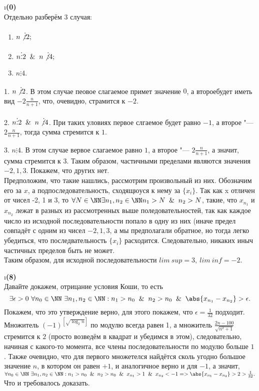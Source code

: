 \i \textbf{(0)}\\
Отдельно разберём 3 случая:
\begin{enumerate}
    \item $n \not\vdots 2;$
    \item $n \vdots 2 \And n \not\vdots 4;$
    \item $n \vdots 4.$
\end{enumerate}
\par 1. $n \not\vdots 2$. В этом случае пеовое слагаемое примет значение $0$, а второебудет иметь вид $-2\frac{n}{n+1}$, что, очевидно, страмится к $-2$.
\par 2. $n \vdots 2 \And n \not\vdots 4$. При таких уловиях первое слгаемое будет равно $-1$, а второе "--- $2\frac{n}{n+1}$, тогда сумма стремится к $1$.
\par 3. $n \vdots 4$. В этом случае вервое слагаемое равно $1$, а второе "--- $2\frac{n}{n+1}$, а значит, сумма стремится к $3$.
Таким образом, частичными пределами являются значения $-2, 1, 3$. Покажем, что других нет.\\
Предположим, что такие нашлись, рассмотрим произвольный из них. Обозначим его за $x$, а подпоследовательность, сходящюуся к нему за $\{x_i\}$. Так как x отличен от чисел -2, 1 и 3, то $\forall N \in \NN \exists n_1, n_2 \in \NN n_1 > N \And n_2 > N$, такие, что $x_{n_1}$ и $x_{n_2}$ лежат в разных из рассмотренных выше поледовательностей, так как каждое число из исходной последовательности попало в одну из них (иначе предел совпадёт с одним из чисел $-2, 1, 3$, а мы предполагали обратное, но тогда легко убедиться, что последвательность $\{x_i\}$ расходится. Следовательно, никаких иныч частичных пределов быть не может.\\
Таким образом, для исходной последовательности $lim\ sup = 3, \ lim\ inf = -2$.

\i \textbf{(8)}\\
Давайте докажем, отрицание условия Коши, то есть 
$$\exists \epsilon > 0 \ \forall n_0 \in \NN \ \exists n_1, n_2 \in \NN: n_1 > n_0 \And n_2 > n_0 \And \abs{x_{n_1} - x_{n_2}} > \epsilon.$$
Покажем, что это утверждение верно, для этого покажем, что $\epsilon = \frac{1}{32}$ подходит. Множитель $(-1)^{\left[ \sqrt{\log_2{n}} \right]}$ по модулю всегда равен 1, а множитель $\frac{2n-100}{\sqrt{n^2+1}}$ стремится к $2$ (просто возведём в квадрат и убедимся в этом), следовательно, начиная с какого-то момента, все члены последовательности по модулю больше $1$. Также очевидно, что для первого множетелся найдётся сколь угодно большое значение $n$, в котором он равен $+1$, и аналогичное верно и для $-1$, а значит, $\forall n_0 \in \NN \ \exists n_1, n_2 \in \NN: n_1 > n_0 \And n_2 > n_0 \And x_{n_1} > 1 \And x_{n_2} < -1 => \abs{x_{n_1} - x_{n_2}} > 2 > \frac{1}{32}.$ Что и требовалось доказать.

